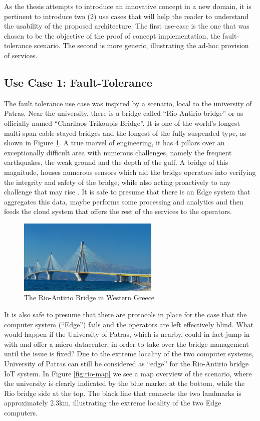 As the thesis attempts to introduce an innovative concept in a new domain, it is pertinent to introduce two (2) use cases that will help the reader to understand the usability of the proposed architecture. The first use-case is the one that was chosen to be the objective of the proof of concept implementation, the fault-tolerance scenario. The second is more generic, illustrating the ad-hoc provision of services.

\subsection{Use Case 1: Fault-Tolerance}

The fault tolerance use case was inspired by a scenario, local to the university of Patras. Near the university, there is a bridge called “Rio-Antirio bridge” or as officially named “Charilaos Trikoupis Bridge”. It is one of the world's longest multi-span cable-stayed bridges and the longest of the fully suspended type, as shown in Figure \ref{fig:riobridge}. A true marvel of engineering, it has 4  pillars over an exceptionally difficult area with numerous challenges, namely the frequent earthquakes, the weak ground and the depth of the gulf. A bridge of this magnitude, houses numerous sensors which aid the bridge operators into verifying the integrity and safety of the bridge, while also acting proactively to any challenge that may rise \cite{rion-antirion-bridge}. It is safe to presume that there is an Edge system that aggregates this data, maybe performs some processing and analytics and then feeds the cloud system that offers the rest of the services to the operators.

\begin{figure}[h]
    \centering
    \includegraphics[width=0.6\textwidth]{images/rio-bridge.jpg}
    \caption{The Rio-Antirio Bridge in Western Greece \cite{riowiki}}
    \label{fig:riobridge}
\end{figure}

It is also safe to presume that there are protocols in place for the case that the computer system (“Edge”) fails and the operators are left effectively blind. What would happen if the University of Patras, which is nearby, could in fact jump in with and offer a micro-datacenter, in order to take over the bridge management until the issue is fixed? Due to the extreme locality of the two computer systems, University of Patras can still be considered as “edge” for the Rio-Antirio bridge IoT system. In Figure \ref{fig:rio-map} we see a map overview of the scenario, where the university is clearly indicated by the blue market at the bottom, while the Rio bridge side at the top. The black line that connects the two landmarks is approximately 2.3km, illustrating the extreme locality of the two Edge computers.


